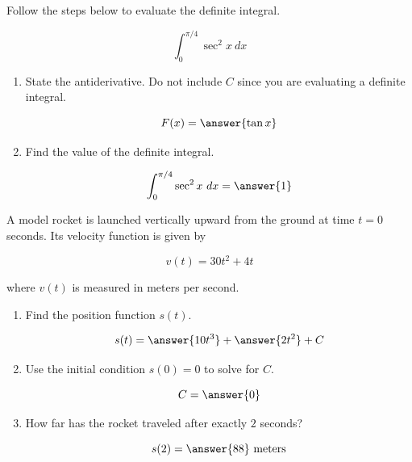 \documentclass{ximera}
\begin{document}
\begin{problem}
Follow the steps below to evaluate the definite integral.

 \[ \int_{0}^{\pi/4} \sec^2 x \ dx \]

\begin{enumerate}
\item State the antiderivative.  Do not include $C$ since you are evaluating a definite integral. 

    \[ F(x) = \answer{\tan x} \]


\item Find the value of the definite integral.

    \[ \int_{0}^{\pi/4} \sec^2 x \ dx = \answer{1}   \]

\end{enumerate}
\end{problem}


\begin{problem}
A model rocket is launched vertically upward from the ground at time $t = 0$ seconds.  
Its velocity function is given by 

\[
v(t) = 30t^2 + 4t
\]

where $v(t)$ is measured in meters per second.


\begin{enumerate}
\item Find the position function $s(t).$

\[
s(t) = \answer{10t^3} + \answer{2t^2} + C
\]

\item Use the initial condition $s(0) = 0$ to solve for $C.$

\[
C = \answer{0}
\]

\item How far has the rocket traveled after exactly $2$ seconds?

\[
s(2) = \answer{88} \text{ meters}
\]

\end{enumerate}
\end{problem}

\end{document}
